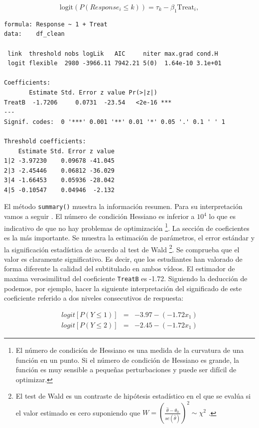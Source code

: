 \documentclass[
  12pt,
  a4paper,
  extrafontsizes,
  onecolumn,
  openright,
  table]{memoir}
\begin{document}
\[
\text{logit}(P(Response_i \leq k)) = \tau_k - \beta_1 \text{Treat}_i,
\]

\scriptsize

\begin{verbatim}
formula: Response ~ 1 + Treat
data:    df_clean

 link  threshold nobs logLik   AIC     niter max.grad cond.H 
 logit flexible  2980 -3966.11 7942.21 5(0)  1.64e-10 3.1e+01

Coefficients:
       Estimate Std. Error z value Pr(>|z|)    
TreatB  -1.7206     0.0731  -23.54   <2e-16 ***
---
Signif. codes:  0 '***' 0.001 '**' 0.01 '*' 0.05 '.' 0.1 ' ' 1

Threshold coefficients:
    Estimate Std. Error z value
1|2 -3.97230    0.09678 -41.045
2|3 -2.45446    0.06812 -36.029
3|4 -1.66453    0.05936 -28.042
4|5 -0.10547    0.04946  -2.132
\end{verbatim}

\normalsize

El método \texttt{summary()} muestra la información resumen. Para su
interpretación vamos a seguir \textcite{christensen2018CumulativeLM}. El
número de condición Hessiano es inferior a \(10^4\) lo que es indicativo
de que no hay problemas de optimización \footnote{El número de condición
  de Hessiano es una medida de la curvatura de una función en un punto.
  Si el número de condición de Hessiano es grande, la función es muy
  sensible a pequeñas perturbaciones y puede ser difícil de optimizar.}.
La sección de coeficientes es la más importante. Se muestra la
estimación de parámetros, el error estándar y la significación
estadística de acuerdo al test de Wald \footnote{El test de Wald es un
  contraste de hipótesis estadístico en el que se evalúa si el valor
  estimado es cero suponiendo que
  \(W = \left(\frac{\hat{\theta} - \theta_0}{se(\hat{\theta})}\right)^2 \sim \chi^{2}\)
  .}. Se comprueba que el valor es claramente significativo. Es decir,
que los estudiantes han valorado de forma diferente la calidad del
subtitulado en ambos vídeos. El estimador de maxima verosimilitud del
coeficiente \texttt{TreatB} es -1.72. Siguiendo la deducción de
\textcite{bruin2011} podemos, por ejemplo, hacer la siguiente
interpretación del significado de este coeficiente referido a dos
niveles consecutivos de respuesta:

\[
\begin{aligned}
logit [P(Y \le 1)] & = & -3.97 - (-1.72 x_1) \\
logit [P(Y \le 2)] & = & -2.45 - (-1.72 x_1)
\end{aligned}
\]
\end{document}
